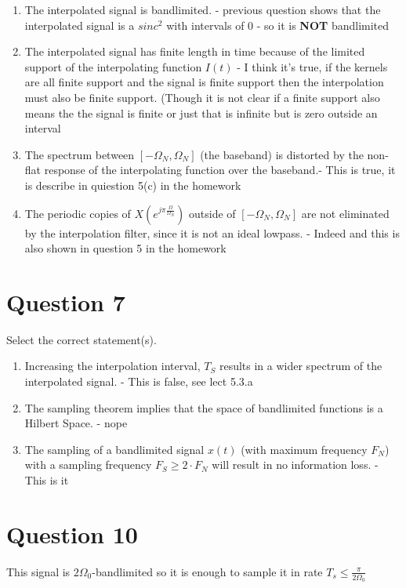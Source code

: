 \documentclass[a4paper]{article}
\begin{document}
\begin{enumerate}
\item The interpolated signal is bandlimited. - previous question shows that the interpolated signal
is a $sinc^2$ with intervals of 0 - so it is {\bf NOT} bandlimited

\item The interpolated signal has finite length in time because of the limited support of the interpolating function $I(t)$ - I think it's true, if the kernels are all finite support and the signal is finite support
then the interpolation must also be finite support. (Though it is not clear if a finite support also
means the the signal is finite or just that is infinite but is zero outside an interval

\item The spectrum between $[-\Omega_N,\Omega_N]$ (the baseband) is distorted by the non-flat response of the interpolating function over the baseband.- This is true, it is describe in quiestion 5(c) in the homework

\item The periodic copies of $X(e^{j \pi \frac{\Omega}{\Omega_N}})$ outside of $[-\Omega_N,\Omega_N]$
are not eliminated by the interpolation filter, since it is not an ideal lowpass. - Indeed and 
this is also shown in question 5 in the homework
\end{enumerate}


\section{Question 7}
Select the correct statement(s).
\begin{enumerate}
\item Increasing the interpolation interval, $T_S$ results in a wider spectrum of the interpolated signal. -
This is false, see lect 5.3.a
\item The sampling theorem implies that the space of bandlimited functions is a Hilbert Space.
- nope
\item The sampling of a bandlimited signal $x(t)$ (with maximum frequency $F_N$) with a sampling frequency $F_S \ge 2 \cdot F_N$ will result in no information loss. - This is it
\end{enumerate}

\section{Question 10}
This signal is $2\Omega_0$-bandlimited so it is enough to sample it in rate $T_s \le \frac{\pi}{2\Omega_0}$
\end{document}
